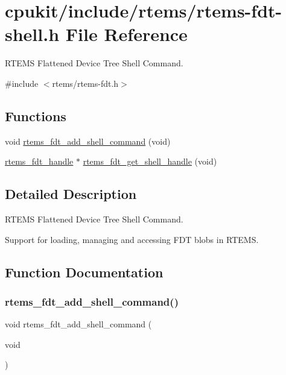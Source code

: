 \hypertarget{rtems-fdt-shell_8h}{}\section{cpukit/include/rtems/rtems-\/fdt-\/shell.h File Reference}
\label{rtems-fdt-shell_8h}


R\+T\+E\+MS Flattened Device Tree Shell Command.  


{\ttfamily \#include $<$rtems/rtems-\/fdt.\+h$>$}\newline
\subsection*{Functions}
\begin{DoxyCompactItemize}
\item 
void \mbox{\hyperlink{rtems-fdt-shell_8h_abb37bd70380bdbe1fb1f45db28fad2b0}{rtems\+\_\+fdt\+\_\+add\+\_\+shell\+\_\+command}} (void)
\item 
\mbox{\hyperlink{structrtems__fdt__handle}{rtems\+\_\+fdt\+\_\+handle}} $\ast$ \mbox{\hyperlink{rtems-fdt-shell_8h_a60aacc9efa15224a053dc5c51f1cbd4b}{rtems\+\_\+fdt\+\_\+get\+\_\+shell\+\_\+handle}} (void)
\end{DoxyCompactItemize}


\subsection{Detailed Description}
R\+T\+E\+MS Flattened Device Tree Shell Command. 

Support for loading, managing and accessing F\+DT blobs in R\+T\+E\+MS. 

\subsection{Function Documentation}
\mbox{\label{rtems-fdt-shell_8h_abb37bd70380bdbe1fb1f45db28fad2b0}} 
\subsubsection{\texorpdfstring{rtems\_fdt\_add\_shell\_command()}{rtems\_fdt\_add\_shell\_command()}}
{\footnotesize\ttfamily void rtems\+\_\+fdt\+\_\+add\+\_\+shell\+\_\+command (\begin{DoxyParamCaption}\item[{void}]{ }\end{DoxyParamCaption})}

